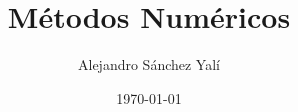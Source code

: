 

\title{Métodos Numéricos}
\author{Alejandro Sánchez Yalí}
\date{\today}


\makeglossaries



\frontmatter





\tableofcontents
\listoffigures
\listoftables

\mainmatter






\backmatter

\printbibliography

\printglossaries
\printindex


